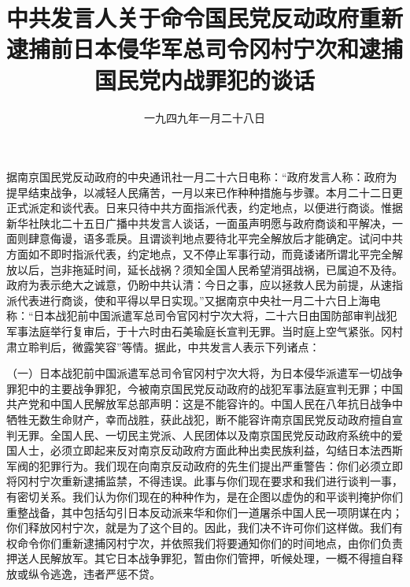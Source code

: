 
\title{中共发言人关于命令国民党反动政府重新逮捕前日本侵华军总司令冈村宁次和逮捕国民党内战罪犯的谈话}
\date{一九四九年一月二十八日}
\maketitle


据南京国民党反动政府的中央通讯社一月二十六日电称：“政府发言人称：政府为提早结束战争，以减轻人民痛苦，一月以来已作种种措施与步骤。本月二十二日更正式派定和谈代表。日来只待中共方面指派代表，约定地点，以便进行商谈。惟据新华社陕北二十五日广播中共发言人谈话，一面虽声明愿与政府商谈和平解决，一面则肆意侮谩，语多乖戾。且谓谈判地点要待北平完全解放后才能确定。试问中共方面如不即时指派代表，约定地点，又不停止军事行动，而竟诿诸所谓北平完全解放以后，岂非拖延时间，延长战祸？须知全国人民希望消弭战祸，已属迫不及待。政府为表示绝大之诚意，仍盼中共认清：今日之事，应以拯救人民为前提，从速指派代表进行商谈，使和平得以早日实现。”又据南京中央社一月二十六日上海电称：“日本战犯前中国派遣军总司令官冈村宁次大将，二十六日由国防部审判战犯军事法庭举行复审后，于十六时由石美瑜庭长宣判无罪。当时庭上空气紧张。冈村肃立聆判后，微露笑容”等情。据此，中共发言人表示下列诸点：

（一）日本战犯前中国派遣军总司令官冈村宁次大将，为日本侵华派遣军一切战争罪犯中的主要战争罪犯，今被南京国民党反动政府的战犯军事法庭宣判无罪；中国共产党和中国人民解放军总部声明：这是不能容许的。中国人民在八年抗日战争中牺牲无数生命财产，幸而战胜，获此战犯，断不能容许南京国民党反动政府擅自宣判无罪。全国人民、一切民主党派、人民团体以及南京国民党反动政府系统中的爱国人士，必须立即起来反对南京反动政府方面此种出卖民族利益，勾结日本法西斯军阀的犯罪行为。我们现在向南京反动政府的先生们提出严重警告：你们必须立即将冈村宁次重新逮捕监禁，不得违误。此事与你们现在要求和我们进行谈判一事，有密切关系。我们认为你们现在的种种作为，是在企图以虚伪的和平谈判掩护你们重整战备，其中包括勾引日本反动派来华和你们一道屠杀中国人民一项阴谋在内；你们释放冈村宁次，就是为了这个目的。因此，我们决不许可你们这样做。我们有权命令你们重新逮捕冈村宁次，并依照我们将要通知你们的时间地点，由你们负责押送人民解放军。其它日本战争罪犯，暂由你们管押，听候处理，一概不得擅自释放或纵令逃逸，违者严惩不贷。

